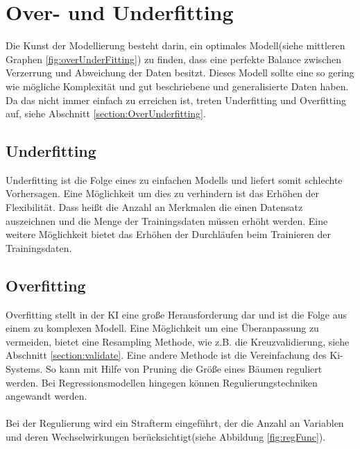 \documentclass[12pt,oneside,a4paper,parskip]{scrbook}
\begin{document}
\section{Over- und Underfitting}
\label{section:preventData}
Die Kunst der Modellierung besteht darin, ein optimales Modell(siehe mittleren Graphen \ref{fig:overUnderFitting}) zu finden, dass eine perfekte Balance zwischen Verzerrung und Abweichung der Daten besitzt. Dieses Modell sollte eine so gering wie mögliche Komplexität und gut beschriebene und generalisierte Daten haben. Da das nicht immer einfach zu erreichen ist, treten Underfitting und Overfitting auf, siehe Abschnitt \ref{section:OverUnderfitting}.

\subsection{Underfitting}
Underfitting ist die Folge eines zu einfachen Modells und liefert somit schlechte Vorhersagen. Eine Möglichkeit um dies zu verhindern ist das Erhöhen der Flexibilität. Dass heißt die Anzahl an Merkmalen die einen Datensatz auszeichnen und die Menge der Trainingsdaten müssen erhöht werden. Eine weitere Möglichkeit bietet das Erhöhen der Durchläufen beim Trainieren der Trainingsdaten.

\subsection{Overfitting}
Overfitting stellt in der KI eine große Herausforderung dar und ist die Folge aus einem zu komplexen Modell. Eine Möglichkeit um eine Überanpassung zu vermeiden, bietet eine Resampling Methode, wie z.B. die Kreuzvalidierung, siehe Abschnitt \ref{section:validate}. 
Eine andere Methode ist die Vereinfachung des Ki-Systems. So kann mit Hilfe von Pruning die Größe eines Bäumen reguliert werden\cite{overUnderfittingNovu}. Bei Regressionsmodellen hingegen können Regulierungstechniken angewandt werden.
\\\\
Bei der Regulierung wird ein Strafterm eingeführt, der die Anzahl an Variablen und deren Wechselwirkungen berücksichtigt(siehe Abbildung \ref{fig:regFunc}).
\end{document}
